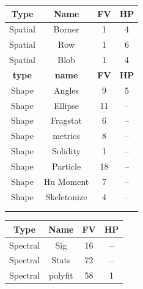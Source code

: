 \documentclass[../thesis.tex]{subfiles}
\begin{document}
    \null
    \vfill
    \begin{table}[H]
        \centering
        \begin{tabular}{|c|c|c|c|}
            \hline
            \textbf{Type} & \textbf{Name}		& \textbf{FV} & \textbf{HP} \\
            \hline
            Spatial & Borner  		&   1 & 4 \\
            Spatial & Row     		&   1 & 6 \\
            Spatial & Blob    		&   1 & 4 \\
            \hline
            \textbf{type} & \textbf{name}		& \textbf{FV} & \textbf{HP} \\
            \hline
            Shape & Angles			&   9 & 5 \\
            Shape & Ellipse	 		&  11 & -- \\
            Shape & Fragstat		&   6 & -- \\
            Shape & metrics			&   8 & -- \\
            Shape & Solidity		&   1 & -- \\
            Shape & Particle		&  18 & -- \\
            Shape & Hu Moment		&   7 & -- \\
            Shape & Skeletonize		&   4 & -- \\
            &&& \\
            &&& \\
            \hline
        \end{tabular}
        \begin{tabular}{|c|c|c|c|}
            \hline
            \textbf{Type} & \textbf{Name}		& \textbf{FV} & \textbf{HP} \\
            \hline
            Spectral & Sig			&  16 & -- \\
            Spectral & Stats		&  72 & -- \\
            Spectral & polyfit		&  58 & 1 \\
            

\end{tabular}
\end{table}
\end{document}

